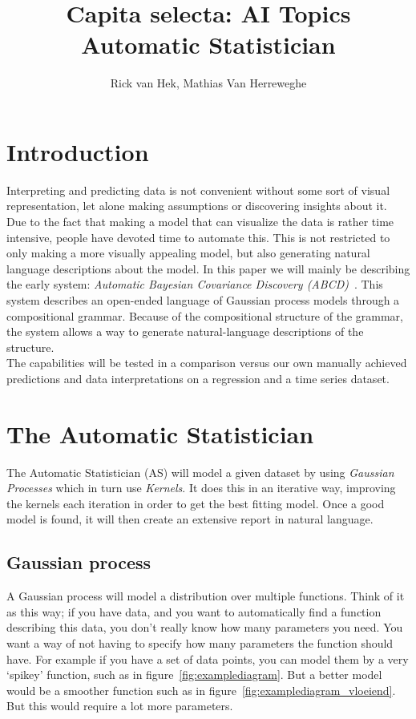 \documentclass[a4paper, 10pt, conference]{ieeeconf}
\title{\LARGE \textbf{Capita selecta: AI Topics} \\ 
Automatic Statistician}
\author{Rick van Hek, Mathias Van Herreweghe}
\begin{document}
\maketitle
\thispagestyle{plain}
\pagestyle{plain}


\tableofcontents

\section{Introduction}
Interpreting and predicting data is not convenient without some sort of visual representation, let alone making assumptions or discovering insights about it. Due to the fact that making a model that can visualize the data is rather time intensive, people have devoted time to automate this. This is not restricted to only making a more visually appealing model, but also generating natural language descriptions about the model. In this paper we will mainly be describing the early system: \textit{Automatic Bayesian Covariance Discovery (ABCD)}~\cite{lloyd2014automatic}. This system describes an open-ended language of Gaussian process models through a compositional grammar. Because of the compositional structure of the grammar, the system allows a way to generate natural-language descriptions of the structure.\\
The capabilities will be tested in a comparison versus our own manually achieved predictions and data interpretations on a regression and a time series dataset.


\section{The Automatic Statistician}
The Automatic Statistician (AS) will model a given dataset by using \textit{Gaussian Processes} which in turn use \textit{Kernels}. It does this in an iterative way, improving the kernels each iteration in order to get the best fitting model. Once a good model is found, it will then create an extensive report in natural language.
\subsection{Gaussian process}
A Gaussian process will model a distribution over multiple functions. Think of it as this way; if you have data, and you want to automatically find a function describing this data, you don't really know how many parameters you need. You want a way of not having to specify how many parameters the function should have. For example if you have a set of data points, you can model them by a very `spikey' function, such as in figure~\ref{fig:examplediagram}. But a better model would be a smoother function such as in figure~\ref{fig:examplediagram_vloeiend}. But this would require a lot more parameters.
\end{document}
